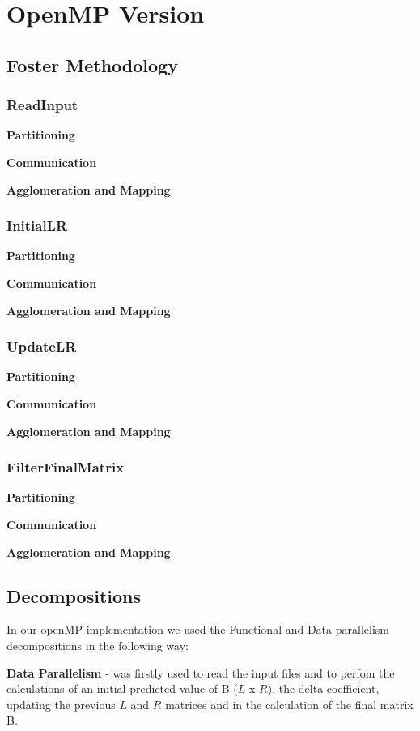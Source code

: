 \documentclass[twocolumn]{article}
\begin{document}
    \section{OpenMP Version}\label{sec:openmp-version}

    \subsection{Foster Methodology}
    \label{subsec:foster-methodology}
    \subsubsection{ReadInput}
    \textbf{Partitioning}

    \textbf{Communication}

    \textbf{Agglomeration and Mapping}

    \subsubsection{InitialLR}
    \textbf{Partitioning}

    \textbf{Communication}

    \textbf{Agglomeration and Mapping}

    \subsubsection{UpdateLR}
    \textbf{Partitioning}

    \textbf{Communication}

    \textbf{Agglomeration and Mapping}

    \subsubsection{FilterFinalMatrix}
    \textbf{Partitioning}

    \textbf{Communication}

    \textbf{Agglomeration and Mapping}


    \subsection{Decompositions}
    \label{subsec:decompostions}
    In our openMP implementation we used the Functional and Data parallelism decompositions in the following way:

    \textbf{Data Parallelism} - was firstly used to read the input files and to perfom the calculations of an initial predicted value of B ($L$ x $R$), the delta coefficient, updating the previous $L$ and $R$ matrices and in the calculation of the final matrix B\@.
\end{document}
